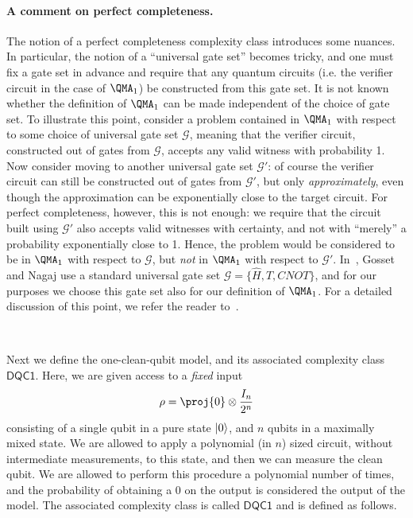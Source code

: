 \documentclass[11pt]{article}
\numberwithin{equation}{section}
\newcommand{\DQC}{\mathsf{DQC1}}
\renewcommand\( {\left(}
\renewcommand\) {\right)}
\begin{document}
\paragraph{A comment on perfect completeness.} The notion of a perfect completeness complexity class introduces some nuances. In particular, the notion of a ``universal gate set'' becomes tricky, and one must fix a gate set in advance and require that any quantum circuits (i.e. the verifier circuit in the case of $\QMA_1$) be constructed from this gate set. It is not known whether the definition of $\QMA_1$ can be made independent of the choice of gate set. To illustrate this point, consider a problem contained in $\QMA_1$ with respect to some choice of universal gate set $\mathcal{G}$, meaning that the verifier circuit, constructed out of gates from $\mathcal{G}$, accepts any valid witness with probability 1. Now consider moving to another universal gate set $\mathcal{G}'$: of course the verifier circuit can still be constructed out of gates from $\mathcal{G}'$, but only \emph{approximately}, even though the approximation can be exponentially close to the target circuit. For perfect completeness, however, this is not enough: we require that the circuit built using $\mathcal{G}'$ also accepts valid witnesses with certainty, and not with ``merely'' a probability exponentially close to 1. Hence, the problem would be considered to be in $\QMA_1$ with respect to $\mathcal{G}$, but \emph{not} in $\QMA_1$ with respect to $\mathcal{G}'$. In~\cite{Gosset_2013}, Gosset and Nagaj use a standard universal gate set $\mathcal{G} = \{\hat{H}, T, CNOT\}$, and for our purposes we choose this gate set also for our definition of $\QMA_1$. For a detailed discussion of this point, we refer the reader to~\cite{Gosset_2013}. 

\ 

Next we define the one-clean-qubit model, and its associated complexity class $\DQC$. Here, we are given access to a \emph{fixed} input 
\begin{equation}
     \rho = \proj{0} \otimes \frac{I_n}{2^n}
\end{equation}
consisting of a single qubit in a pure state $\ket{0}$, and $n$ qubits in a maximally mixed state. We are allowed to apply a polynomial (in $n$) sized circuit, without intermediate measurements, to this state, and then we can measure the clean qubit. We are allowed to perform this procedure a polynomial number of times, and the probability of obtaining a $0$ on the output is considered the output of the model. The associated complexity class is called $\DQC$ and is defined as follows.
\end{document}
